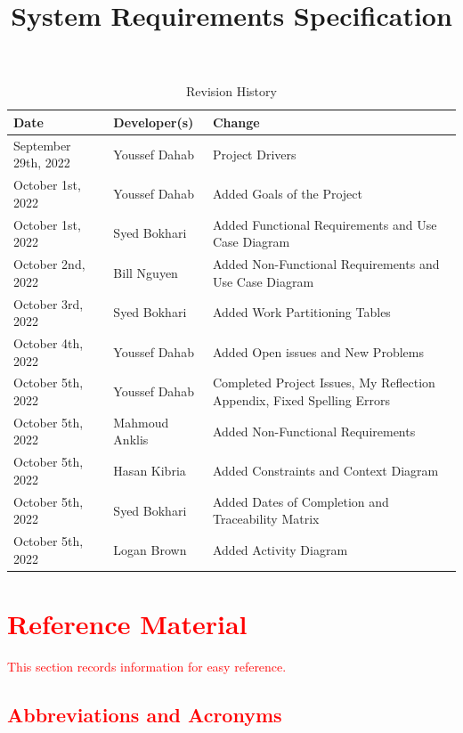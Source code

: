 \documentclass[12pt,letterpaper]{article}
\title{System Requirements Specification\\\progname}
\author{\authname}
\date{}
\begin{document}
\maketitle

\begin{table}[hp]
	\caption{Revision History} \label{TblRevisionHistory}
	\begin{tabularx}{\textwidth}{llX}
		\toprule
		\textbf{Date} & \textbf{Developer(s)} & \textbf{Change}\\
		\midrule
		September 29th, 2022 & Youssef Dahab & Project Drivers \\
		October 1st, 2022 & Youssef Dahab & Added Goals of the Project \\
		October 1st, 2022 & Syed Bokhari & Added Functional Requirements and Use Case Diagram \\
		October 2nd, 2022 & Bill Nguyen & Added Non-Functional Requirements and Use Case Diagram \\
		October 3rd, 2022 & Syed Bokhari & Added Work Partitioning Tables \\
		October 4th, 2022 & Youssef Dahab & Added Open issues and New Problems \\
		October 5th, 2022 & Youssef Dahab & Completed Project Issues, My Reflection Appendix, Fixed Spelling Errors\\
		October 5th, 2022 & Mahmoud Anklis & Added Non-Functional Requirements\\
		October 5th, 2022 & Hasan Kibria & Added Constraints and Context Diagram \\
		October 5th, 2022 & Syed Bokhari & Added Dates of Completion and Traceability Matrix \\
		October 5th, 2022 & Logan Brown & Added Activity Diagram\\
		\bottomrule
	\end{tabularx}
\end{table}

\newpage
\tableofcontents

\newpage
\section{\textcolor{red}{Reference Material}}

\textcolor{red}{This section records information for easy reference.}

\subsection{\textcolor{red}{Abbreviations and Acronyms}}
\end{document}
